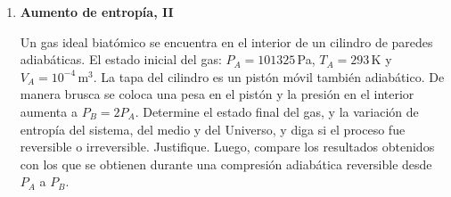 \documentclass[a4paper,12pt]{article}
\begin{document}
\begin{enumerate}
	\item {\bf{Aumento de entropía, II}}
		
		Un gas ideal biatómico se encuentra en el interior de un cilindro de
		paredes adiabáticas. El estado inicial del gas: $P_A=101325$\,Pa,
		$T_A=293$\,K y $V_A=10^{-4}$\,m$^3$. La tapa del cilindro es un pistón
		móvil también adiabático. De manera brusca se coloca una pesa en el
		pistón y la presión en el interior aumenta a $P_B=2 P_A$. Determine el
		estado final del gas, y la variación de entropía del sistema, del medio
		y del Universo, y diga si el proceso fue reversible o irreversible.
		Justifique. Luego, compare los resultados obtenidos con los que se
		obtienen durante una compresión adiabática reversible desde $P_A$ a
		$P_B$.

\end{enumerate}
\end{document}
